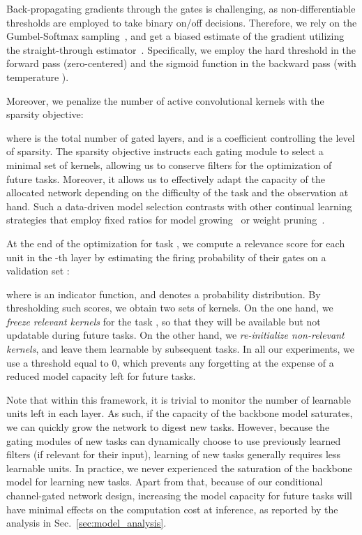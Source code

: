 \documentclass[10pt,twocolumn,letterpaper]{article}
\begin{document}
Back-propagating gradients through the gates is challenging, as non-differentiable thresholds are employed to take binary on/off decisions. Therefore, we rely on the Gumbel-Softmax sampling~\cite{jang2016categorical,maddison2016concrete}, and get a biased estimate of the gradient utilizing the straight-through estimator~\cite{bengio2013estimating}. Specifically, we employ the hard threshold in the forward pass (zero-centered) and the sigmoid function in the backward pass (with temperature ).

Moreover, we penalize the number of active convolutional kernels with the sparsity objective:

where  is the total number of gated layers, and  is a coefficient controlling the level of sparsity. The sparsity objective instructs each gating module to select a minimal set of kernels, allowing us to conserve filters for the optimization of future tasks. Moreover, it allows us to effectively adapt the capacity of the allocated network depending on the difficulty of the task and the observation at hand. Such a data-driven model selection contrasts with other continual learning strategies that employ fixed ratios for model growing~\cite{progressivenns} or weight pruning~\cite{packnet}.

At the end of the optimization for task , we compute a relevance score  for each unit in the -th layer by estimating the firing probability of their gates on a validation set :

where  is an indicator function, and  denotes a probability distribution.
By thresholding such scores, we obtain two sets of kernels. On the one hand, we \textit{freeze relevant kernels} for the task , so that they will be available but not updatable during future tasks. On the other hand, we \textit{re-initialize non-relevant kernels}, and leave them learnable by subsequent tasks. In all our experiments, we use a threshold equal to 0, which prevents any forgetting at the expense of a reduced model capacity left for future tasks.

Note that within this framework, it is trivial to monitor the number of learnable units left in each layer. As such, if the capacity of the backbone model saturates, we can quickly grow the network to digest new tasks. However, because the gating modules of new tasks can dynamically choose to use previously learned filters (if relevant for their input), learning of new tasks generally requires less learnable units. In practice, we never experienced the saturation of the backbone model for learning new tasks. Apart from that, because of our conditional channel-gated network design, increasing the model capacity for future tasks will have minimal effects on the computation cost at inference, as reported by the analysis in Sec.~\ref{sec:model_analysis}.
\end{document}
